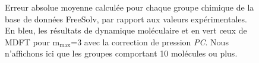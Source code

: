 \begin{figure}[H]
  \centering
  \caption[Erreur absolue moyenne pour chaque groupe chimique de la base données FreeSolv calculée par MDFT avec la correction \textit{PC}.]{Erreur absolue moyenne calculée pour chaque groupe chimique de la base de données FreeSolv, par rapport aux valeurs expérimentales. En bleu, les résultats de dynamique moléculaire et en vert ceux de MDFT pour $\mathrm{m}_\mathrm{max}$=3 avec la correction de pression \textit{PC}. Nous n'affichons ici que les groupes comportant 10 molécules ou plus.}
  \label{fig:AUE:mmax3}
\end{figure}



